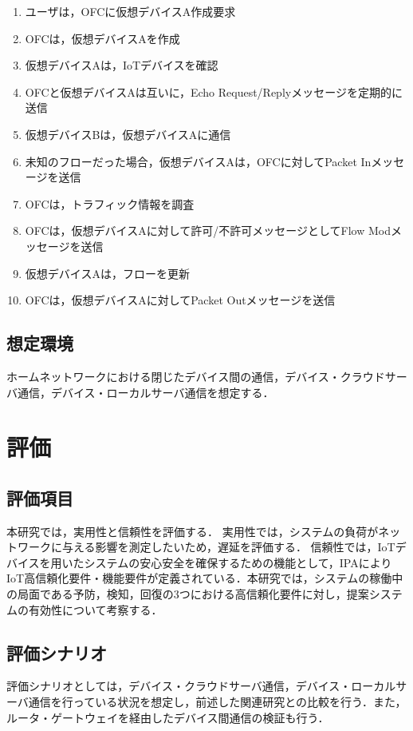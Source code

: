 \documentclass[a4paper,10pt,twocolumn,uplatex]{jsarticle}
\begin{document}
\begin{enumerate}
  \item ユーザは，OFCに仮想デバイスA作成要求
  \item OFCは，仮想デバイスAを作成
  \item 仮想デバイスAは，IoTデバイスを確認
  \item OFCと仮想デバイスAは互いに，Echo Request/Replyメッセージを定期的に送信
  \item 仮想デバイスBは，仮想デバイスAに通信
  \item 未知のフローだった場合，仮想デバイスAは，OFCに対してPacket Inメッセージを送信
  \item OFCは，トラフィック情報を調査
  \item OFCは，仮想デバイスAに対して許可/不許可メッセージとしてFlow Modメッセージを送信
  \item 仮想デバイスAは，フローを更新
  \item OFCは，仮想デバイスAに対してPacket Outメッセージを送信
\end{enumerate}

\subsection{想定環境}
ホームネットワークにおける閉じたデバイス間の通信，デバイス・クラウドサーバ通信，デバイス・ローカルサーバ通信を想定する．

\section{評価}
\subsection{評価項目}
本研究では，実用性と信頼性を評価する．
実用性では，システムの負荷がネットワークに与える影響を測定したいため，遅延を評価する．
信頼性では，IoTデバイスを用いたシステムの安心安全を確保するための機能として，IPAによりIoT高信頼化要件・機能要件が定義されている\cite{IPA}．本研究では，システムの稼働中の局面である予防，検知，回復の3つにおける高信頼化要件に対し，提案システムの有効性について考察する．


\subsection{評価シナリオ}
評価シナリオとしては，デバイス・クラウドサーバ通信，デバイス・ローカルサーバ通信を行っている状況を想定し，前述した関連研究との比較を行う．また，ルータ・ゲートウェイを経由したデバイス間通信の検証も行う．
\end{document}
